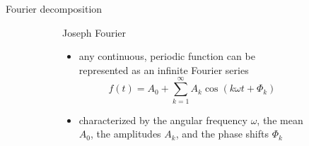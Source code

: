 \documentclass{beamer}
\begin{document}
\begin{frame}{Fourier decomposition}
  \begin{figure}
    \centering
    \begin{subfigure}[c]{0.3\textwidth}
      \centering
      \caption*{Joseph Fourier}
    \end{subfigure}
    \begin{subfigure}[c]{0.65\textwidth}
      \begin{itemize}
      \item any continuous, periodic function can be represented as an
        infinite Fourier series
        \begin{displaymath}
          f(t) = A_0 + \sum_{k=1}^\infty A_k \cos(k \omega t + \Phi_k)
        \end{displaymath}
      \item characterized by the angular frequency $\omega$, the mean $A_0$,
        the amplitudes $A_k$, and the phase shifts $\Phi_k$
      \end{itemize}
    \end{subfigure}

    \textcite{fourier1808memoire}
  \end{figure}
\end{frame}
\end{document}
